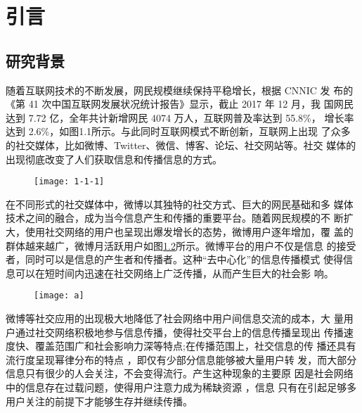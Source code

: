 \chapter{引言}\label{chap:one}

\section{研究背景}


随着互联网技术的不断发展，网民规模继续保持平稳增长，根据 CNNIC 发 布的《第 41 次中国互联网发展状况统计报告》显示\citep{CNNIC}，截止 2017 年 12 月，我 国网民达到 7.72 亿，全年共计新增网民 4074 万人，互联网普及率达到 55.8\%， 增长率达到 2.6\%，如图1.1所示。与此同时互联网模式不断创新，互联网上出现 了众多的社交媒体，比如微博、Twitter、微信、博客、论坛、社交网站等。社交 媒体的出现彻底改变了人们获取信息和传播信息的方式\citep{wuyue1}。


\begin{figure}[!htbp]
    \centering
    \texttt{[image: 1-1-1]}
    \label{fig:1-1-1}
\end{figure}

在不同形式的社交媒体中，微博以其独特的社交方式、巨大的网民基础和多 媒体技术之间的融合，成为当今信息产生和传播的重要平台。随着网民规模的不 断扩大，使用社交网络的用户也呈现出爆发增长的态势，微博用户逐年增加，覆 盖的群体越来越广，微博月活跃用户如图\ref{fig:a}所示。微博平台的用户不仅是信息 的接受者，同时可以是信息的产生者和传播者。这种“去中心化”的信息传播模式 使得信息可以在短时间内迅速在社交网络上广泛传播，从而产生巨大的社会影 响。

\begin{figure}[H]
    \centering
    \texttt{[image: a]}
    \label{fig:a}
\end{figure}


微博等社交应用的出现极大地降低了社会网络中用户间信息交流的成本，大 量用户通过社交网络积极地参与信息传播，使得社交平台上的信息传播呈现出 传播速度快、覆盖范围广和社会影响力深等特点;在传播范围上，社交信息的传 播还具有流行度呈现幂律分布的特点 \citep{Bakshy2011Everyone}，即仅有少部分信息能够被大量用户转 发，而大部分信息只有很少的人会关注，不会变得流行。产生这种现象的主要原 因是社会网络中的信息存在过载问题，使得用户注意力成为稀缺资源 \citep{Davenport2001The}，信息 只有在引起足够多用户关注的前提下才能够生存并继续传播。

